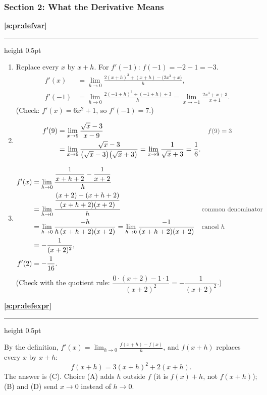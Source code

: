 \documentclass[11pt,a4paper]{article}
\newcommand{\solitem}[2]{%
 \par\addvspace{16pt}\Needspace{10\baselineskip}%
 {\large\bfseries \ref{#1}}\par\nobreak\vspace{2pt}%
 {\color{rulegray}\hrule height 0.5pt}\nobreak\vspace{7pt}%
 #2\par}
\newcommand{\why}[1]{\text{\small\color{darkgray}#1}}
\begin{document}
\subsubsection*{Section 2: What the Derivative Means}
\solitem{a:pr:defvar}{%
\begin{enumerate}[label=(\alph*)]
 \item Replace every $x$ by $x+h$. For $f'(-1)$: $f(-1)=-2-1=-3$.
 \begin{align*}
 f'(x)&=\lim_{h\to0}\frac{2(x+h)^3+(x+h)-\bigl(2x^3+x\bigr)}{h},\\
 f'(-1)&=\lim_{h\to0}\frac{2(-1+h)^3+(-1+h)+3}{h}=\lim_{x\to-1}\frac{2x^3+x+3}{x+1}.
 \end{align*}
 (Check: $f'(x)=6x^2+1$, so $f'(-1)=7$.)
 \item
 \begin{align*}
 f'(9)&=\lim_{x\to9}\frac{\sqrt x-3}{x-9} &&\why{$f(9)=3$}\\
 &=\lim_{x\to9}\frac{\sqrt x-3}{\bigl(\sqrt x-3\bigr)\bigl(\sqrt x+3\bigr)}=\lim_{x\to9}\frac{1}{\sqrt x+3}=\frac16.
 \end{align*}
 \item
 \begin{align*}
 f'(x)&=\lim_{h\to0}\frac{\dfrac{1}{x+h+2}-\dfrac{1}{x+2}}{h}\\
 &=\lim_{h\to0}\frac{\dfrac{(x+2)-(x+h+2)}{(x+h+2)(x+2)}}{h} &&\why{common denominator}\\
 &=\lim_{h\to0}\frac{-h}{h\,(x+h+2)(x+2)}=\lim_{h\to0}\frac{-1}{(x+h+2)(x+2)} &&\why{cancel $h$}\\
 &=-\frac{1}{(x+2)^2},\\
 f'(2)&=-\frac{1}{16}.
 \end{align*}
 (Check with the quotient rule: $\dfrac{0\cdot(x+2)-1\cdot1}{(x+2)^2}=-\dfrac{1}{(x+2)^2}$.)
\end{enumerate}
}

\solitem{a:pr:defexpr}{%
By the definition, $f'(x)=\displaystyle\lim_{h\to0}\frac{f(x+h)-f(x)}{h}$, and $f(x+h)$ replaces every $x$ by $x+h$:
\[
f(x+h)=3(x+h)^2+2(x+h).
\]
The answer is (C). Choice (A) adds $h$ outside $f$ (it is $f(x)+h$, not $f(x+h)$); (B) and (D) send $x\to0$ instead of $h\to0$.
}
\end{document}
